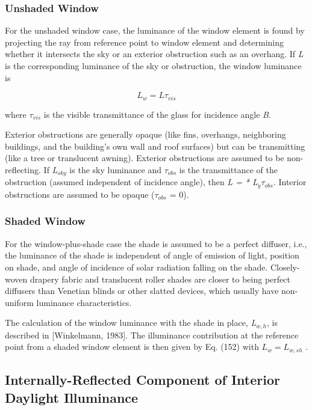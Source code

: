\subsubsection{Unshaded Window}\label{unshaded-window}

For the unshaded window case, the luminance of the window element is found by projecting the ray from reference point to window element and determining whether it intersects the sky or an exterior obstruction such as an overhang. If \emph{L} is the corresponding luminance of the sky or obstruction, the window luminance is

\begin{equation}
{L_w} = L{\tau_{vis}}
\end{equation}

where \({\tau_{vis}}\) is the visible transmittance of the glass for incidence angle \emph{B}.

Exterior obstructions are generally opaque (like fins, overhangs, neighboring buildings, and the building's own wall and roof surfaces) but can be transmitting (like a tree or translucent awning). Exterior obstructions are assumed to be non-reflecting. If \emph{L\(_{sky}\)} is the sky luminance and \emph{$\tau$\(_{obs}\)} is the transmittance of the obstruction (assumed independent of incidence angle), then \emph{L = * L\(_{y}\)$\tau$\(_{obs}\)}. Interior obstructions are assumed to be opaque ($\tau$\(_{obs}\) = 0).

\subsubsection{Shaded Window}\label{shaded-window}

For the window-plus-shade case the shade is assumed to be a perfect diffuser, i.e., the luminance of the shade is independent of angle of emission of light, position on shade, and angle of incidence of solar radiation falling on the shade. Closely-woven drapery fabric and translucent roller shades are closer to being perfect diffusers than Venetian blinds or other slatted devices, which usually have non-uniform luminance characteristics.

The calculation of the window luminance with the shade in place, \emph{L\(_{w,h}\)}, is described in {[}Winkelmann, 1983{]}. The illuminance contribution at the reference point from a shaded window element is then given by Eq. (152) with \({L_w} = {L_{w,sh}}\) .

\subsection{Internally-Reflected Component of Interior Daylight Illuminance}\label{internally-reflected-component-of-interior-daylight-illuminance}

